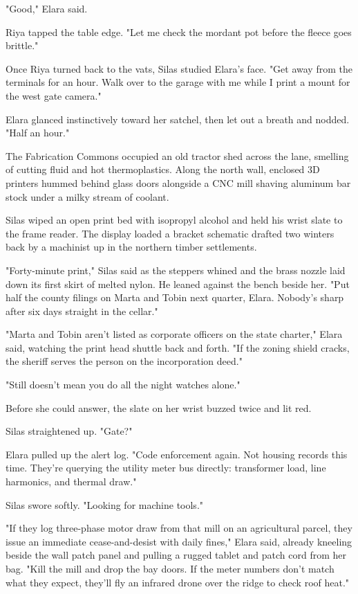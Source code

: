 "Good," Elara said.

Riya tapped the table edge. "Let me check the mordant pot before the fleece goes brittle."

Once Riya turned back to the vats, Silas studied Elara's face. "Get away from the terminals for an hour. Walk over to the garage with me while I print a mount for the west gate camera."

Elara glanced instinctively toward her satchel, then let out a breath and nodded. "Half an hour."

\bigskip

The Fabrication Commons occupied an old tractor shed across the lane, smelling of cutting fluid and hot thermoplastics. Along the north wall, enclosed 3D printers hummed behind glass doors alongside a CNC mill shaving aluminum bar stock under a milky stream of coolant.

Silas wiped an open print bed with isopropyl alcohol and held his wrist slate to the frame reader. The display loaded a bracket schematic drafted two winters back by a machinist up in the northern timber settlements.

"Forty-minute print," Silas said as the steppers whined and the brass nozzle laid down its first skirt of melted nylon. He leaned against the bench beside her. "Put half the county filings on Marta and Tobin next quarter, Elara. Nobody's sharp after six days straight in the cellar."

"Marta and Tobin aren't listed as corporate officers on the state charter," Elara said, watching the print head shuttle back and forth. "If the zoning shield cracks, the sheriff serves the person on the incorporation deed."

"Still doesn't mean you do all the night watches alone."

Before she could answer, the slate on her wrist buzzed twice and lit red.

Silas straightened up. "Gate?"

Elara pulled up the alert log. "Code enforcement again. Not housing records this time. They're querying the utility meter bus directly: transformer load, line harmonics, and thermal draw."

Silas swore softly. "Looking for machine tools."

"If they log three-phase motor draw from that mill on an agricultural parcel, they issue an immediate cease-and-desist with daily fines," Elara said, already kneeling beside the wall patch panel and pulling a rugged tablet and patch cord from her bag. "Kill the mill and drop the bay doors. If the meter numbers don't match what they expect, they'll fly an infrared drone over the ridge to check roof heat."

